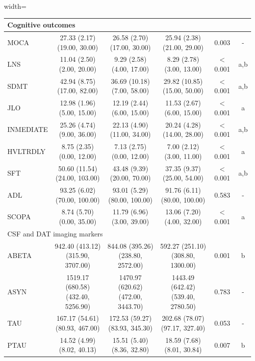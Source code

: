 \documentclass[12pt]{article}
\begin{document}
\begin{description}
\begin{table}[t]
\begin{adjustbox}{width=\textwidth}
\begin{tabular}{|l||c|c|c|c|c|}
				\hline
				\multicolumn{6}{|l|}{Cognitive outcomes} \\
				\hline
				MOCA &        27.33 (2.17) (19.00, 30.00) &        26.58 (2.70) (17.00, 30.00) &        25.94 (2.38) (21.00, 29.00) &     0.003 &    -      \\
				LNS &         11.04 (2.50) (2.00, 20.00) &          9.29 (2.58) (4.00, 17.00) &          8.29 (2.78) (3.00, 13.00) & $<$ 0.001 &      a,b \\
				SDMT &        42.94 (8.75) (17.00, 82.00) &        36.69 (10.18) (7.00, 58.00) &       29.82 (10.85) (15.00, 50.00) & $<$ 0.001 &      a,b \\
				JLO &         12.98 (1.96) (5.00, 15.00) &         12.19 (2.44) (6.00, 15.00) &         11.53 (2.67) (6.00, 15.00) & $<$ 0.001 &        a \\
				INMEDIATE &         25.26 (4.74) (9.00, 36.00) &        22.13 (4.90) (11.00, 34.00) &        20.24 (4.28) (14.00, 28.00) & $<$ 0.001 &      a,b \\
				HVLTRDLY &          8.75 (2.35) (0.00, 12.00) &          7.13 (2.75) (0.00, 12.00) &          7.00 (2.12) (3.00, 11.00) & $<$ 0.001 &        a \\
				SFT &      50.60 (11.54) (24.00, 103.00) &        43.48 (9.39) (20.00, 70.00) &        37.35 (9.37) (25.00, 54.00) & $<$ 0.001 &      a,b \\
				ADL &       93.25 (6.02) (70.00, 100.00) &       93.01 (5.29) (80.00, 100.00) &       91.76 (6.11) (80.00, 100.00) &     0.583 &   -   \\
				SCOPA &          8.74 (5.70) (0.00, 35.00) &         11.79 (6.96) (3.00, 39.00) &         13.06 (7.20) (4.00, 32.00) & $<$ 0.001 &        a \\
				\hline
				\multicolumn{6}{|l|}{CSF and DAT imaging markers} \\
				\hline
				ABETA &  942.40 (413.12) (315.90, 3707.00) &  844.08 (395.26) (238.80, 2572.00) &  592.27 (251.10) (308.80, 1300.00) &     0.001 &        b \\
				ASYN & 1519.17 (680.58) (432.40, 5256.90) & 1470.97 (620.62) (472.00, 3443.70) & 1443.49 (642.42) (539.40, 2780.50) &     0.783 &  -    \\
				TAU &     167.17 (54.61) (80.93, 467.00) &     172.53 (59.27) (83.93, 345.30) &     202.68 (78.07) (97.17, 327.40) &     0.053 &   -   \\
				PTAU &         14.52 (4.99) (8.02, 40.13) &         15.51 (5.40) (8.36, 32.80) &         18.59 (7.68) (8.01, 30.84) &     0.007 &        b \\

\end{tabular}
\end{adjustbox}
\end{table}
\end{description}
\end{document}
